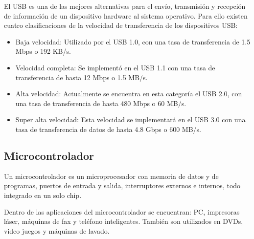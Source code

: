 \vspace{0.2cm}

El USB es una de las mejores alternativas para el envío,
transmisión y recepción de información de un dispositivo hardware
al sistema operativo. Para ello existen cuatro clasificaciones de
la velocidad de transferencia de los
dispositivos USB:\\

\begin{itemize}
    \item Baja velocidad: Utilizado por el USB 1.0, con una tasa de transferencia de 1.5 Mbps o 192 KB/s.
    \item Velocidad completa: Se implementó en el USB 1.1 con una tasa de transferencia de hasta 12 Mbps o 1.5 MB/s.
    \item Alta velocidad: Actualmente se encuentra en esta categoría el USB 2.0, con una tasa de transferencia de hasta 480 Mbps o 60 MB/s.
    \item Super alta velocidad: Esta velocidad se implementará en el USB 3.0 con una tasa de transferencia de datos de hasta 4.8 Gbps o 600
    MB/s.\cite{librodeUSB}
\end{itemize}

\vspace{0.2cm}

\subsection{Microcontrolador}

Un microcontrolador es un microprocesador con memoria de datos y
de programas, puertos de entrada y salida, interruptores externos
e internos, todo integrado en un solo chip.\cite{libroPIC}\\

\vspace{0.2cm}

Dentro de las aplicaciones del microcontrolador se encuentran: PC,
impresoras láser, máquinas de fax y teléfono inteligentes. También
son utilizados en DVDs, video juegos y máquinas de lavado.\\

\vspace{0.2cm}
